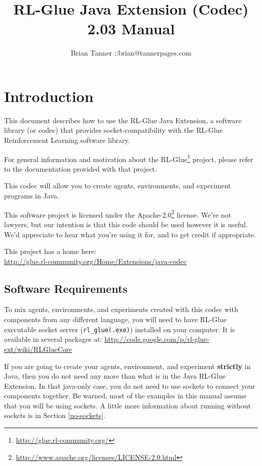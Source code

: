\documentclass[11pt]{article}
\title{RL-Glue Java Extension (Codec) 2.03 Manual }
\author{Brian Tanner ::brian@tannerpages.com}
\begin{document}
\maketitle
\tableofcontents

\section{Introduction}

This document describes how to use the RL-Glue Java Extension, a software library (or codec) that provides socket-compatibility with the RL-Glue Reinforcement Learning software library.

For general information and motivation about the RL-Glue\footnote{\url{http://glue.rl-community.org/}} project, please refer to the documentation provided with that project.

This codec will allow you to create agents, environments, and experiment programs in Java.

This software project is licensed under the Apache-2.0\footnote{\url{http://www.apache.org/licenses/LICENSE-2.0.html}} license. We're not lawyers, but our intention is that this code 
should be used however it is useful.  We'd appreciate to hear what you're using it for, and to get credit if appropriate.

This project has a home here:\\
\url{http://glue.rl-community.org/Home/Extensions/java-codec}



\subsection{Software Requirements}
To mix agents, environments, and experiments created with this codec with components from any different language, you will need to have RL-Glue executable socket server (\texttt{rl\_glue(.exe)}) installed on your computer.  It is available in several packages at:\newline
\url{http://code.google.com/p/rl-glue-ext/wiki/RLGlueCore}

If you are going to create your agents, environment, and experiment \textbf{strictly} in Java, then you do not need any more than what is in the Java RL-Glue Extension.  In that java-only case, you do not need to use sockets to connect your components together.  Be warned, most of the examples in this manual assume that you will be using sockets. A little more information about running without sockets is in Section \ref{no-sockets}.
\end{document}
